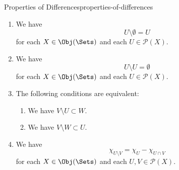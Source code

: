 \begin{proposition}{Properties of Differences}{properties-of-differences}
\begin{enumerate}
            \[
                \emptyset\setminus U%
                =%
                \emptyset%
            \]%
            for each $X\in\Obj(\Sets)$ and each $U\in\mathcal{P}(X)$.
        \item\label{properties-of-differences-right-unitality}We have
            \[
                U\setminus\emptyset%
                =%
                U%
            \]%
            for each $X\in\Obj(\Sets)$ and each $U\in\mathcal{P}(X)$.
        \item\label{properties-of-differences-invertibility}We have
            \[
                U\setminus U
                =
                \emptyset
            \]%
            for each $X\in\Obj(\Sets)$ and each $U\in\mathcal{P}(X)$.
        \item\label{properties-of-differences-interaction-with-containment}The following conditions are equivalent:
            \begin{enumerate}
                \item\label{properties-of-differences-interaction-with-containment-a}We have $V\setminus U\subset W$.
                \item\label{properties-of-differences-interaction-with-containment-b}We have $V\setminus W\subset U$.
            \end{enumerate}
        \item\label{properties-of-differences-interaction-with-characteristic-functions}We have
            \[
                \chi_{U\setminus V}%
                =%
                \chi_{U}%
                -%
                \chi_{U\cap V}%
            \]%
            for each $X\in\Obj(\Sets)$ and each $U,V\in\mathcal{P}(X)$.
    \end{enumerate}
\end{proposition}
